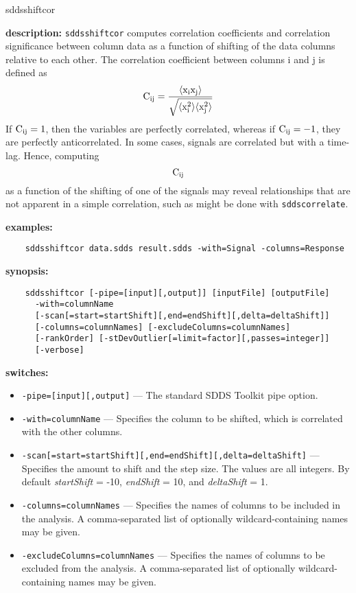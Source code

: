 \begin{sddsprog}{sddsshiftcor}
  \item \textbf{description:} \verb|sddsshiftcor| computes correlation coefficients and correlation significance between column data as a function of shifting of the data columns relative to each other. The correlation coefficient between columns i and j is defined as
  \[
  {\rm C_{ij} = \frac{\langle x_i x_j \rangle}{\sqrt{\langle x_i^2\rangle\langle x_j^2 \rangle}}}
  \]
  If ${\rm C_{ij}=1}$, then the variables are perfectly correlated, whereas if ${\rm C_{ij}=-1}$, they are perfectly anticorrelated. In some cases, signals are correlated but with a time-lag. Hence, computing \[ {\rm C_{ij}} \] as a function of the shifting of one of the signals may reveal relationships that are not apparent in a simple correlation, such as might be done with \verb|sddscorrelate|.
  \item \textbf{examples:}
    \begin{verbatim}
    sddsshiftcor data.sdds result.sdds -with=Signal -columns=Response
    \end{verbatim}
  \item \textbf{synopsis:}
    \begin{verbatim}
    sddsshiftcor [-pipe=[input][,output]] [inputFile] [outputFile]
      -with=columnName
      [-scan[=start=startShift][,end=endShift][,delta=deltaShift]]
      [-columns=columnNames] [-excludeColumns=columnNames]
      [-rankOrder] [-stDevOutlier[=limit=factor][,passes=integer]]
      [-verbose]
    \end{verbatim}
  \item \textbf{switches:}
    \begin{itemize}
      \item \verb|-pipe=[input][,output]| --- The standard SDDS Toolkit pipe option.
      \item \verb|-with=columnName| --- Specifies the column to be shifted, which is correlated with the other columns.
      \item \verb|-scan[=start=startShift][,end=endShift][,delta=deltaShift]| --- Specifies the amount to shift and the step size. The values are all integers. By default \emph{startShift} = -10, \emph{endShift} = 10, and \emph{deltaShift} = 1.
      \item \verb|-columns=columnNames| --- Specifies the names of columns to be included in the analysis. A comma-separated list of optionally wildcard-containing names may be given.
      \item \verb|-excludeColumns=columnNames| --- Specifies the names of columns to be excluded from the analysis. A comma-separated list of optionally wildcard-containing names may be given.

\end{itemize}
\end{sddsprog}
